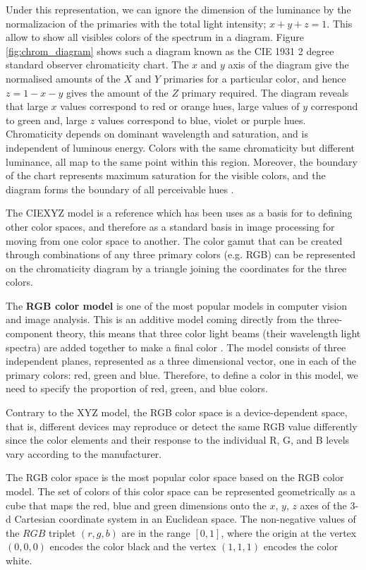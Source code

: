 Under this representation, we can ignore the dimension of the luminance by the normalizacion of the primaries with the total light intensity; $x+y+z=1$. This allow to show all visibles colors of the spectrum in a diagram. Figure \ref{fig:chrom_diagram} shows such a diagram known as the CIE 1931 2 degree standard observer chromaticity chart. The $x$ and $y$ axis of the diagram give the normalised amounts of the $X$ and $Y$ primaries for a particular color, and hence $z = 1 - x - y$ gives the amount of the $Z$ primary required. The diagram reveals that large $x$ values correspond to red or orange hues, large values of $y$ correspond to green and, large $z$ values correspond to blue, violet or purple hues. Chromaticity depends on dominant wavelength and saturation, and is independent of luminous energy. Colors with the same chromaticity but different luminance, all map to the same point within this region. Moreover, the boundary of the chart represents maximum saturation for the visible colors, and the diagram forms the boundary of all perceivable hues \citep{Bull:Book:2014}. 

The CIEXYZ model is a reference which has been uses as a basis for to defining other color spaces, and therefore as a standard basis in image processing for moving from one color space to another. The color gamut that can be created through combinations of any three primary colors (e.g. RGB) can be represented on the chromaticity diagram by a triangle joining the coordinates for the three colors. 

The \textbf{RGB color model} is one of the most popular models in computer vision and image analysis. This is an additive model coming directly from the three-component theory, this means that three color light beams (their wavelength light spectra) are added together to make a final color \citep{Gonzalez.Woods:Book:2008}. The model consists of three independent planes, represented as a three dimensional vector, one in each of the primary colors: red, green and blue. Therefore, to define a color in this model, we need to specify the proportion of red, green, and blue colors. 

Contrary to the XYZ model, the RGB color space is a device-dependent space, that is, different devices may reproduce or detect the same RGB value differently since the color elements and their response to the individual R, G, and B levels vary according to the manufacturer.

The RGB color space is the most popular color space based on the RGB color model. The set of colors of this color space can be represented geometrically as a cube that maps the red, blue and green dimensions onto the $x$, $y$, $z$ axes of the 3-d Cartesian coordinate system in an Euclidean space. The non-negative values of the $RGB$ triplet $(r,g,b)$ are in the range $[0,1]$, where the origin at the vertex $(0,0,0)$ encodes the color black and the vertex $(1,1,1)$ encodes the color white. 


